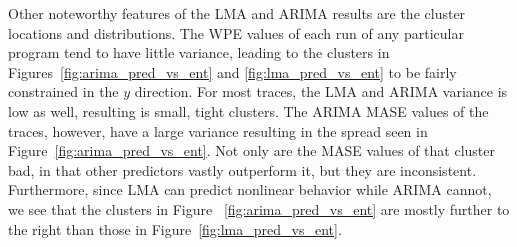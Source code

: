 






 


Other noteworthy features of the LMA and ARIMA results are the cluster locations
and distributions. The WPE values of each run of any particular program tend to
have little variance, leading to the clusters in
Figures~\ref{fig:arima_pred_vs_ent} and \ref{fig:lma_pred_vs_ent} to be fairly
constrained in the $y$ direction. For most traces, the LMA and ARIMA variance is
low as well, resulting is small, tight clusters. The ARIMA MASE values of the \col
traces, however, have a large variance resulting in the spread seen in
Figure~\ref{fig:arima_pred_vs_ent}. Not only are the MASE values of that cluster
bad, in that other predictors vastly outperform it, but they are inconsistent.
Furthermore, since LMA can predict nonlinear behavior while ARIMA cannot, we
see that the clusters in Figure ~\ref{fig:arima_pred_vs_ent} are mostly further to
the right than those in Figure~\ref{fig:lma_pred_vs_ent}.

